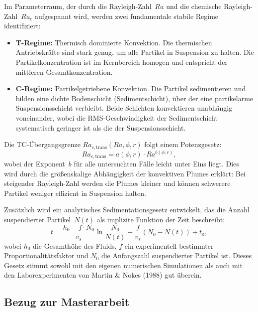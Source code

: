 \documentclass[a4paper,12pt]{article}
\begin{document}
Im Parameterraum, der durch die Rayleigh-Zahl~$Ra$ und die chemische
Rayleigh-Zahl~$Ra_c$ aufgespannt wird, werden zwei fundamentale stabile Regime
identifiziert:

\begin{itemize}
    \item \textbf{T-Regime:} Thermisch dominierte Konvektion. Die thermischen
        Antriebskr\"afte sind stark genug, um alle Partikel in Suspension zu
        halten. Die Partikelkonzentration ist im Kernbereich homogen und
        entspricht der mittleren Gesamtkonzentration.

    \item \textbf{C-Regime:} Partikelgetriebene Konvektion. Die Partikel
        sedimentieren und bilden eine dichte Bodenschicht (Sedimentschicht),
        \"uber der eine partikelarme Suspensionsschicht verbleibt. Beide
        Schichten konvektieren unabh\"angig voneinander, wobei die
        RMS-Geschwindigkeit der Sedimentschicht systematisch geringer ist als
        die der Suspensionsschicht.
\end{itemize}

Die TC-\"Ubergangsgrenze $Ra_{c,\mathrm{trans}}(Ra, \phi, r)$ folgt einem
Potenzgesetz:
\begin{equation}
    Ra_{c,\mathrm{trans}} = a(\phi, r)\cdot Ra^{b(\phi, r)},
\end{equation}
wobei der Exponent~$b$ f\"ur alle untersuchten F\"alle leicht unter Eins liegt.
Dies wird durch die gr\"o{\ss}enskalige Abh\"angigkeit der konvektiven Plumes
erkl\"art: Bei steigender Rayleigh-Zahl werden die Plumes kleiner und k\"onnen
schwerere Partikel weniger effizient in Suspension halten.

Zus\"atzlich wird ein analytisches Sedimentationsgesetz entwickelt, das die
Anzahl suspendierter Partikel~$N(t)$ als implizite Funktion der Zeit beschreibt:
\begin{equation}
    t = \frac{h_0 - f\cdot N_0}{v_s}\ln\frac{N_0}{N(t)} + \frac{f}{v_s}(N_0 - N(t)) + t_0,
\end{equation}
wobei $h_0$ die Gesamth\"ohe des Fluids, $f$ ein experimentell bestimmter
Proportionalit\"atsfaktor und $N_0$ die Anfangszahl suspendierter Partikel ist.
Dieses Gesetz stimmt sowohl mit den eigenen numerischen Simulationen als auch
mit den Laborexperimenten von Martin \& Nokes (1988) gut \"uberein.

\subsection*{Bezug zur Masterarbeit}
\end{document}
